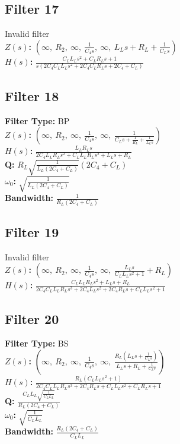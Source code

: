 \documentclass{article}
\begin{document}
\subsection*{Filter 17}
Invalid filter \\ 
\textbf{$Z(s)$:} $\left( \infty, \  R_{2}, \  \infty, \  \frac{1}{C_{4} s}, \  \infty, \  L_{L} s + R_{L} + \frac{1}{C_{L} s}\right)$ \\ 
\textbf{$H(s)$:} $\frac{C_{L} L_{L} s^{2} + C_{L} R_{L} s + 1}{s \left(2 C_{4} C_{L} L_{L} s^{2} + 2 C_{4} C_{L} R_{L} s + 2 C_{4} + C_{L}\right)}$ \\ 
\subsection*{Filter 18}
\textbf{Filter Type:} BP \\ 
\textbf{$Z(s)$:} $\left( \infty, \  R_{2}, \  \infty, \  \frac{1}{C_{4} s}, \  \infty, \  \frac{1}{C_{L} s + \frac{1}{R_{L}} + \frac{1}{L_{L} s}}\right)$ \\ 
\textbf{$H(s)$:} $\frac{L_{L} R_{L} s}{2 C_{4} L_{L} R_{L} s^{2} + C_{L} L_{L} R_{L} s^{2} + L_{L} s + R_{L}}$ \\ 
\textbf{Q:} $R_{L} \sqrt{\frac{1}{L_{L} \left(2 C_{4} + C_{L}\right)}} \left(2 C_{4} + C_{L}\right)$ \\ 
\textbf{$\omega_0$:} $\sqrt{\frac{1}{L_{L} \left(2 C_{4} + C_{L}\right)}}$ \\ 
\textbf{Bandwidth:} $\frac{1}{R_{L} \left(2 C_{4} + C_{L}\right)}$ \\ 
\subsection*{Filter 19}
Invalid filter \\ 
\textbf{$Z(s)$:} $\left( \infty, \  R_{2}, \  \infty, \  \frac{1}{C_{4} s}, \  \infty, \  \frac{L_{L} s}{C_{L} L_{L} s^{2} + 1} + R_{L}\right)$ \\ 
\textbf{$H(s)$:} $\frac{C_{L} L_{L} R_{L} s^{2} + L_{L} s + R_{L}}{2 C_{4} C_{L} L_{L} R_{L} s^{3} + 2 C_{4} L_{L} s^{2} + 2 C_{4} R_{L} s + C_{L} L_{L} s^{2} + 1}$ \\ 
\subsection*{Filter 20}
\textbf{Filter Type:} BS \\ 
\textbf{$Z(s)$:} $\left( \infty, \  R_{2}, \  \infty, \  \frac{1}{C_{4} s}, \  \infty, \  \frac{R_{L} \left(L_{L} s + \frac{1}{C_{L} s}\right)}{L_{L} s + R_{L} + \frac{1}{C_{L} s}}\right)$ \\ 
\textbf{$H(s)$:} $\frac{R_{L} \left(C_{L} L_{L} s^{2} + 1\right)}{2 C_{4} C_{L} L_{L} R_{L} s^{3} + 2 C_{4} R_{L} s + C_{L} L_{L} s^{2} + C_{L} R_{L} s + 1}$ \\ 
\textbf{Q:} $\frac{C_{L} L_{L} \sqrt{\frac{1}{C_{L} L_{L}}}}{R_{L} \left(2 C_{4} + C_{L}\right)}$ \\ 
\textbf{$\omega_0$:} $\sqrt{\frac{1}{C_{L} L_{L}}}$ \\ 
\textbf{Bandwidth:} $\frac{R_{L} \left(2 C_{4} + C_{L}\right)}{C_{L} L_{L}}$ \\ 
\end{document}
